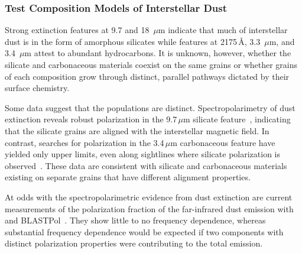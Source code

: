 \documentclass[PICOReport.tex]{subfiles}
\begin{document}
\subsubsection{Test Composition Models of Interstellar Dust}
\label{sec:test_composition_models}

Strong extinction features at 9.7 and 18~$\mu$m indicate that much of interstellar dust is in the form of amorphous silicates while features at 2175\,\AA, 3.3~$\mu$m, and 3.4~$\mu$m attest to abundant hydrocarbons. It is unknown, however, whether the silicate and carbonaceous materials coexist on the same grains or whether grains of each composition grow through distinct, parallel pathways dictated by their surface chemistry. 


Some data suggest that the populations are distinct. Spectropolarimetry of dust extinction reveals robust polarization in the 9.7\,$\mu$m silicate feature~\citep[e.g.,][]{Smith2000}, indicating that the silicate grains are aligned with the interstellar magnetic field. In contrast, searches for polarization in the 3.4\,$\mu$m carbonaceous feature have yielded only upper limits, even along sightlines where silicate polarization is observed~\citep{Chiar2006,Mason2007}. These data are consistent with silicate and carbonaceous materials existing on separate grains that have different alignment properties. 

At odds with the spectropolarimetric evidence from dust extinction are current measurements of the polarization fraction of the far-infrared dust emission with \planck~\citep{Planck_Int_XXII} and BLASTPol~\citep{Ashton2018}. They show little to no frequency dependence, whereas substantial frequency dependence would be expected if two components with distinct polarization properties were contributing to the total emission. 
\end{document}
